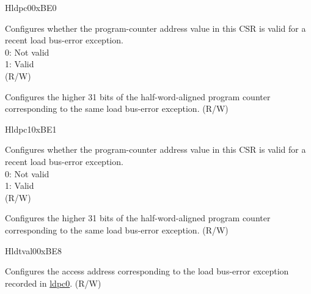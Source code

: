 \begin{register}{H}{ldpc0}{0xBE0}\label{regdesc:LDPC0}%
%
%
\regnewline%
\begin{regdesc}\begin{reglist}
\label{fielddesc:LDPC0_VLD}\item [VLD] Configures whether the program-counter address value in this CSR is valid for a recent load bus-error exception.\\
0: Not valid\\
1: Valid\\
(R/W)
\label{fielddesc:LDPC0_ADDR}\item [{ADDR}] Configures the higher 31 bits of the half-word-aligned program counter corresponding to the same load bus-error exception. (R/W)
\end{reglist}\end{regdesc}
\end{register}

\begin{register}{H}{ldpc1}{0xBE1}\label{regdesc:LDPC1}%
%
%
\regnewline%
\begin{regdesc}\begin{reglist}
\label{fielddesc:LDPC1_VLD}\item [VLD] Configures whether the program-counter address value in this CSR is valid for a recent load bus-error exception.\\
0: Not valid\\
1: Valid\\
(R/W)
\label{fielddesc:LDPC1_ADDR}\item [{ADDR}] Configures the higher 31 bits of the half-word-aligned program counter corresponding to the same load bus-error exception. (R/W)
\end{reglist}\end{regdesc}
\end{register}

\begin{register}{H}{ldtval0}{0xBE8}\label{regdesc:LDTVAL0}%
%
\regnewline%
\begin{regdesc}\begin{reglist}
\label{fielddesc:LDTVAL0_ADDR}\item [{ADDR}] Configures the access address corresponding to the load bus-error exception recorded in \hyperref[regdesc:LDPC0]{ldpc0}. (R/W)
\end{reglist}\end{regdesc}
\end{register}

